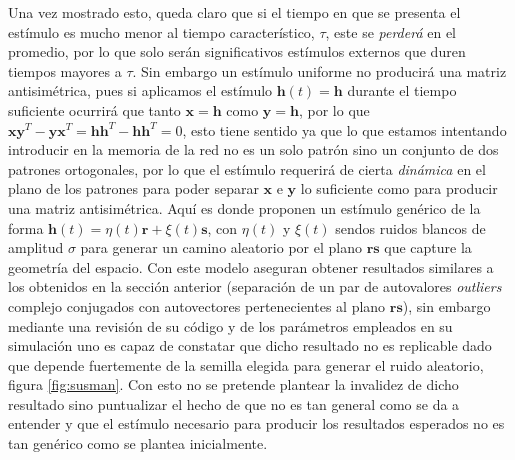 \documentclass[11pt,a4paper,twoside,pdf]{article}
\numberwithin{equation}{section}
\begin{document}
Una vez mostrado esto, queda claro que si el tiempo en que se presenta el estímulo es mucho menor al tiempo característico, \(\tau\), este se \emph{perderá} en el promedio, por lo que solo serán significativos estímulos externos que duren tiempos mayores a \(\tau\). Sin embargo un estímulo uniforme no producirá una matriz antisimétrica, pues si aplicamos el estímulo \(\mathbf{h}(t) = \mathbf{h}\) durante el tiempo suficiente ocurrirá que tanto \(\mathbf{x} = \mathbf{h}\) como \(\mathbf{y} = \mathbf{h}\), por lo que \(\mathbf{xy}^T - \mathbf{yx}^T = \mathbf{hh}^T - \mathbf{hh}^T = 0\), esto tiene sentido ya que lo que estamos intentando introducir en la memoria de la red no es un solo patrón sino un conjunto de dos patrones ortogonales, por lo que el estímulo requerirá de cierta \emph{dinámica} en el plano de los patrones para poder separar \(\mathbf{x}\) e \(\mathbf{y}\) lo suficiente como para producir una matriz antisimétrica. Aquí es donde \textcite{susman2019} proponen un estímulo genérico de la forma \(\mathbf{h}(t) = \eta(t) \mathbf{r} + \xi(t) \mathbf{s}\), con \(\eta(t)\) y \(\xi(t)\) sendos ruidos blancos de amplitud \(\sigma\) para generar un camino aleatorio por el plano \(\mathbf{rs}\) que capture la geometría del espacio. Con este modelo aseguran obtener resultados similares a los obtenidos en la sección anterior (separación  de un par de autovalores \emph{outliers} complejo conjugados con autovectores pertenecientes al plano \(\mathbf{rs}\)), sin embargo mediante una revisión de su código y de los parámetros empleados en su simulación uno es capaz de constatar que dicho resultado no es replicable dado que depende fuertemente de la semilla elegida para generar el ruido aleatorio, figura \ref{fig:susman}. Con esto no se pretende plantear la invalidez de dicho resultado sino puntualizar el hecho de que no es tan general como se da a entender y que el estímulo necesario para producir los resultados esperados no es tan genérico como se plantea inicialmente.
\end{document}
